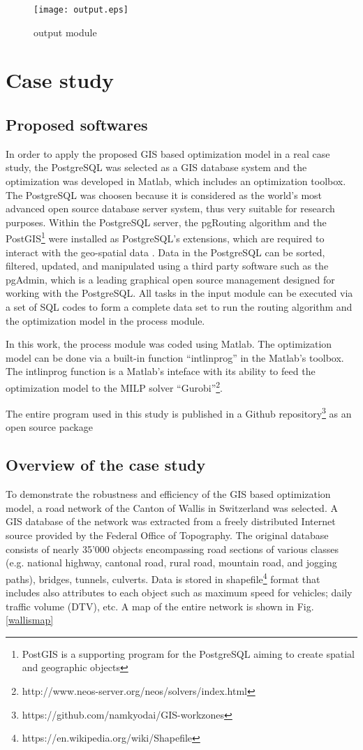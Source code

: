 \documentclass[a4paper,3p,times,authoryear]{elsarticle}
\begin{document}
\begin{figure}[H]
\begin{center}
\texttt{[image: output.eps]}
\caption{output module}\label{output}
\end{center}
\end{figure}
%
\section{Case study} \label{casestudy}
%
\subsection{Proposed softwares}
In order to apply the proposed GIS based optimization model in a real case study, the PostgreSQL was selected as a GIS database system and the optimization was developed in Matlab, which includes an optimization toolbox. The PostgreSQL was choosen because it is considered as the world's most advanced open source database server system, thus very suitable for research purposes. Within the PostgreSQL server, the pgRouting algorithm and the PostGIS\footnote{PostGIS is a supporting program for the PostgreSQL aiming to create spatial and geographic objects} were installed as PostgreSQL's extensions, which are required to interact with the geo-spatial data \citep{Obe2015}. Data in the PostgreSQL can be sorted, filtered, updated, and manipulated using a third party software such as the pgAdmin, which is a leading graphical open source management designed for working with the PostgreSQL. All tasks in the input module can be executed via a set of SQL codes to form a complete data set to run the routing algorithm and the optimization model in the process module. 

In this work, the process module was coded using Matlab. The optimization model can be done via a built-in function ``intlinprog'' in the Matlab's toolbox. The intlinprog function is a Matlab's inteface with its ability to feed the optimization model to the MILP solver ``Gurobi''\footnote{http://www.neos-server.org/neos/solvers/index.html}.

The entire program used in this study is published in a Github repository\footnote{https://github.com/namkyodai/GIS-workzones} as an open source package
\subsection{Overview of the case study}
To demonstrate the robustness and efficiency of the GIS based optimization model, a road network of the Canton of Wallis in Switzerland was selected. A GIS database of the network was extracted from a freely distributed Internet source provided by the Federal Office of Topography. The original database consists of nearly 35'000 objects encompassing road sections of various classes (e.g. national highway, cantonal road, rural road, mountain road, and jogging paths), bridges, tunnels, culverts. Data is stored in shapefile\footnote{https://en.wikipedia.org/wiki/Shapefile} format that includes also attributes to each object such as maximum speed for vehicles; daily traffic volume (DTV), etc. A map of the entire network is shown in Fig. \ref{wallismap}
\end{document}
